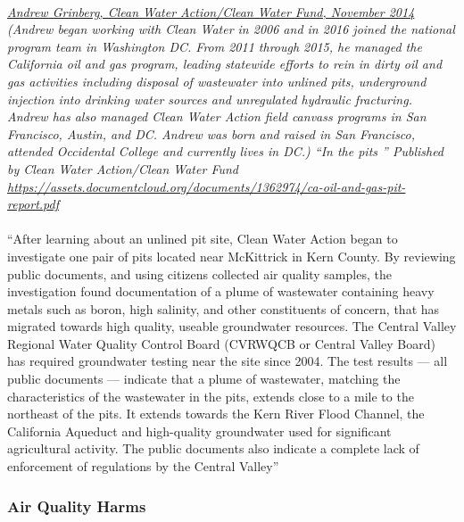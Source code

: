 \documentclass{article}
\begin{document}
\paragraph{}
\small
\textit{  
\underline{Andrew Grinberg, Clean Water Action/Clean Water Fund, November 2014}
  (Andrew began working with Clean Water in 2006 and in 2016 joined the national program team in Washington DC. From 2011 through 2015, he managed the California oil and gas program, leading statewide efforts to rein in dirty oil and gas activities including disposal of wastewater into unlined pits, underground injection into drinking water sources and unregulated hydraulic fracturing. Andrew has also managed Clean Water Action field canvass programs in San Francisco, Austin, and DC. Andrew was born and raised in San Francisco, attended Occidental College and currently lives in DC.) “In the pits ” Published by Clean Water Action/Clean Water Fund 
\url{https://assets.documentcloud.org/documents/1362974/ca-oil-and-gas-pit-report.pdf} }
\normalsize
\paragraph{}
``After learning about an unlined pit site, Clean Water Action began to investigate one pair of pits located near McKittrick in Kern County. By reviewing public documents, and using citizens collected air quality samples, the investigation found documentation of a plume of wastewater containing heavy metals such as boron, high salinity, and other constituents of concern, that has migrated towards high quality, useable groundwater resources. The Central Valley Regional Water Quality Control Board (CVRWQCB or Central Valley Board) has required groundwater testing near the site since 2004. The test results — all public documents — indicate that a plume of wastewater, matching the characteristics of the wastewater in the pits, extends close to a mile to the northeast of the pits. It extends towards the Kern River Flood Channel, the California Aqueduct and high-quality groundwater used for significant agricultural activity. The public documents also indicate a complete lack of enforcement of regulations by the Central Valley''

\subsubsection{Air Quality Harms}
\end{document}
